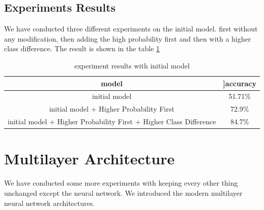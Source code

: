 \documentclass{standalone}
\begin{document}
\subsection{Experiments Results}
We have conducted three different experiments on the initial model. first without any modification, then adding the high probability first and then with a higher class difference. The result is shown in the table \ref{inittable}

    \begin{table}[h!]
    \centering
        \begin{tabular}{|c|c|}
            \hline
            \textbf{model} & ]\textbf{accuracy} \\ [1ex]
            \hline
            initial model & 51.71\% \\
            \hline
            initial model + Higher Probability First & 72.9\%\\
            \hline
            initial model + Higher Probability First + Higher Class
            Difference & 84.7\%  \\ 
            \hline
        \end{tabular}
        \caption{experiment results with initial model}
        \label{inittable}
    \end{table}
\section{Multilayer Architecture}
We have conducted some more experiments with keeping every other thing unchanged except the neural network. We introduced the modern multilayer neural network architectures. 
\end{document}

